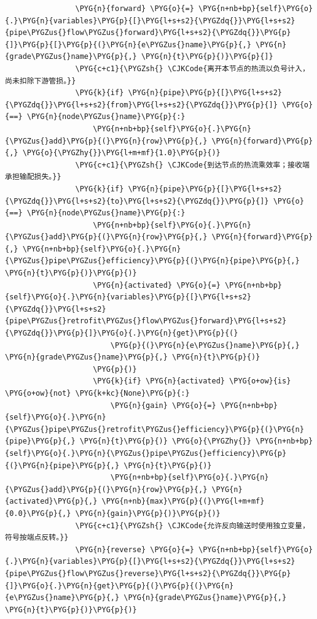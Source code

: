 \begin{Verbatim}
                \PYG{n}{forward} \PYG{o}{=} \PYG{n+nb+bp}{self}\PYG{o}{.}\PYG{n}{variables}\PYG{p}{[}\PYG{l+s+s2}{\PYGZdq{}}\PYG{l+s+s2}{pipe\PYGZus{}flow\PYGZus{}forward}\PYG{l+s+s2}{\PYGZdq{}}\PYG{p}{]}\PYG{p}{[}\PYG{p}{(}\PYG{n}{e\PYGZus{}name}\PYG{p}{,} \PYG{n}{grade\PYGZus{}name}\PYG{p}{,} \PYG{n}{t}\PYG{p}{)}\PYG{p}{]}
                \PYG{c+c1}{\PYGZsh{} \CJKCode{离开本节点的热流以负号计入，尚未扣除下游管损。}}
                \PYG{k}{if} \PYG{n}{pipe}\PYG{p}{[}\PYG{l+s+s2}{\PYGZdq{}}\PYG{l+s+s2}{from}\PYG{l+s+s2}{\PYGZdq{}}\PYG{p}{]} \PYG{o}{==} \PYG{n}{node\PYGZus{}name}\PYG{p}{:}
                    \PYG{n+nb+bp}{self}\PYG{o}{.}\PYG{n}{\PYGZus{}add}\PYG{p}{(}\PYG{n}{row}\PYG{p}{,} \PYG{n}{forward}\PYG{p}{,} \PYG{o}{\PYGZhy{}}\PYG{l+m+mf}{1.0}\PYG{p}{)}
                \PYG{c+c1}{\PYGZsh{} \CJKCode{到达节点的热流乘效率；接收端承担输配损失。}}
                \PYG{k}{if} \PYG{n}{pipe}\PYG{p}{[}\PYG{l+s+s2}{\PYGZdq{}}\PYG{l+s+s2}{to}\PYG{l+s+s2}{\PYGZdq{}}\PYG{p}{]} \PYG{o}{==} \PYG{n}{node\PYGZus{}name}\PYG{p}{:}
                    \PYG{n+nb+bp}{self}\PYG{o}{.}\PYG{n}{\PYGZus{}add}\PYG{p}{(}\PYG{n}{row}\PYG{p}{,} \PYG{n}{forward}\PYG{p}{,} \PYG{n+nb+bp}{self}\PYG{o}{.}\PYG{n}{\PYGZus{}pipe\PYGZus{}efficiency}\PYG{p}{(}\PYG{n}{pipe}\PYG{p}{,} \PYG{n}{t}\PYG{p}{)}\PYG{p}{)}
                    \PYG{n}{activated} \PYG{o}{=} \PYG{n+nb+bp}{self}\PYG{o}{.}\PYG{n}{variables}\PYG{p}{[}\PYG{l+s+s2}{\PYGZdq{}}\PYG{l+s+s2}{pipe\PYGZus{}retrofit\PYGZus{}flow\PYGZus{}forward}\PYG{l+s+s2}{\PYGZdq{}}\PYG{p}{]}\PYG{o}{.}\PYG{n}{get}\PYG{p}{(}
                        \PYG{p}{(}\PYG{n}{e\PYGZus{}name}\PYG{p}{,} \PYG{n}{grade\PYGZus{}name}\PYG{p}{,} \PYG{n}{t}\PYG{p}{)}
                    \PYG{p}{)}
                    \PYG{k}{if} \PYG{n}{activated} \PYG{o+ow}{is} \PYG{o+ow}{not} \PYG{k+kc}{None}\PYG{p}{:}
                        \PYG{n}{gain} \PYG{o}{=} \PYG{n+nb+bp}{self}\PYG{o}{.}\PYG{n}{\PYGZus{}pipe\PYGZus{}retrofit\PYGZus{}efficiency}\PYG{p}{(}\PYG{n}{pipe}\PYG{p}{,} \PYG{n}{t}\PYG{p}{)} \PYG{o}{\PYGZhy{}} \PYG{n+nb+bp}{self}\PYG{o}{.}\PYG{n}{\PYGZus{}pipe\PYGZus{}efficiency}\PYG{p}{(}\PYG{n}{pipe}\PYG{p}{,} \PYG{n}{t}\PYG{p}{)}
                        \PYG{n+nb+bp}{self}\PYG{o}{.}\PYG{n}{\PYGZus{}add}\PYG{p}{(}\PYG{n}{row}\PYG{p}{,} \PYG{n}{activated}\PYG{p}{,} \PYG{n+nb}{max}\PYG{p}{(}\PYG{l+m+mf}{0.0}\PYG{p}{,} \PYG{n}{gain}\PYG{p}{)}\PYG{p}{)}
                \PYG{c+c1}{\PYGZsh{} \CJKCode{允许反向输送时使用独立变量，符号按端点反转。}}
                \PYG{n}{reverse} \PYG{o}{=} \PYG{n+nb+bp}{self}\PYG{o}{.}\PYG{n}{variables}\PYG{p}{[}\PYG{l+s+s2}{\PYGZdq{}}\PYG{l+s+s2}{pipe\PYGZus{}flow\PYGZus{}reverse}\PYG{l+s+s2}{\PYGZdq{}}\PYG{p}{]}\PYG{o}{.}\PYG{n}{get}\PYG{p}{(}\PYG{p}{(}\PYG{n}{e\PYGZus{}name}\PYG{p}{,} \PYG{n}{grade\PYGZus{}name}\PYG{p}{,} \PYG{n}{t}\PYG{p}{)}\PYG{p}{)}

\end{Verbatim}
